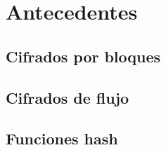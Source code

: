 %
%

\chapter{Antecedentes}



\section{Cifrados por bloques}



\section{Cifrados de flujo}



\section{Funciones hash}


